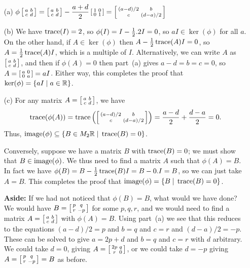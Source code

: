  \begin{itemize}
  \item[(a)] $\displaystyle
   \phi\left[\begin{smallmatrix} a&b\\ c&d\end{smallmatrix}\right] =
   \left[\begin{smallmatrix} a&b\\ c&d\end{smallmatrix}\right] - \frac{a+d}{2}\left[\begin{smallmatrix} 1&0\\0&1\end{smallmatrix}\right] =
   \left[\begin{smallmatrix} (a-d)/2 & b \\ c & (d-a)/2 \end{smallmatrix}\right]
   $
  \item[(b)] We have $\operatorname{trace}(I)=2$, so
   $\phi(I)=I-{\textstyle\frac{1}{2}}.2I=0$, so $aI\in\ker(\phi)$ for all
   $a$.  On the other hand, if $A\in\ker(\phi)$ then
   $A-{\textstyle\frac{1}{2}}\operatorname{trace}(A)I=0$, so $A={\textstyle\frac{1}{2}}\operatorname{trace}(A)I$, which is a
   multiple of $I$.  Alternatively, we can write $A$ as
   $\left[\begin{smallmatrix} a&b\\ c&d\end{smallmatrix}\right]$, and then if $\phi(A)=0$ then
   part~(a) gives $a-d=b=c=0$, so $A=\left[\begin{smallmatrix} a&0\\0&a\end{smallmatrix}\right]=aI$.
   Either way, this completes the proof that
   $\ker(\phi)=\{aI\;|\; a\in{\mathbb{R}}\}$.
  \item[(c)] For any matrix $A=\left[\begin{smallmatrix} a&b\\ c&d\end{smallmatrix}\right]$, we have
   \[ \operatorname{trace}(\phi(A)) =
       \operatorname{trace}\left(\left[\begin{smallmatrix} (a-d)/2 & b \\ c & (d-a)/2 \end{smallmatrix}\right]\right) =
       \frac{a-d}{2} + \frac{d-a}{2} = 0.
   \]
   Thus, $\operatorname{image}(\phi)\subseteq\{B\in M_2{\mathbb{R}}\;|\;\operatorname{trace}(B)=0\}$.

   Conversely, suppose we have a matrix $B$ with
   $\operatorname{trace}(B)=0$; we must show that $B\in\operatorname{image}(\phi)$.  We
   thus need to find a matrix $A$ such that $\phi(A)=B$.  In
   fact we have $\phi(B)=B-{\textstyle\frac{1}{2}}\operatorname{trace}(B)I=B-0.I=B$, so we
   can just take $A=B$.  This completes the proof that
   $\operatorname{image}(\phi)=\{B\;|\;\operatorname{trace}(B)=0\}$.

   \textbf{Aside:} If we had not noticed that $\phi(B)=B$, what would
   we have done?  We would have $B=\left[\begin{smallmatrix} p&q\\ r&-p\end{smallmatrix}\right]$ for some
   $p,q,r$, and we would need to find a matrix $A=\left[\begin{smallmatrix} a&b\\c&d\end{smallmatrix}\right]$
   with $\phi(A)=B$.  Using part~(a) we see that this reduces to the
   equations $(a-d)/2=p$ and $b=q$ and $c=r$ and $(d-a)/2=-p$.  These
   can be solved to give $a=2p+d$ and $b=q$ and $c=r$ with $d$
   arbitrary.  We could take $d=0$, giving $A=\left[\begin{smallmatrix} 2p&q\\r&0\end{smallmatrix}\right]$, or
   we could take $d=-p$ giving $A=\left[\begin{smallmatrix} p&q\\r&-p\end{smallmatrix}\right]=B$ as before.
 \end{itemize}
\EndDeferredSolution

